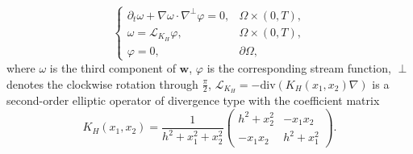 \documentclass[12pt,reqno]{amsart}
\numberwithin{equation}{section}
\theoremstyle{definition}
\theoremstyle{remark}
\begin{document}
\begin{equation}\label{vor str eq}
\begin{cases}
\partial_t \omega+\nabla \omega\cdot \nabla^\perp\varphi=0, &\Omega\times (0,T),\\
\omega=\mathcal{L}_{K_H}\varphi, &\Omega\times (0,T),\\
\varphi =0,& \partial\Omega,
\end{cases}
\end{equation}
where $ \omega  $ is the third component of $ \mathbf{w} $, $ \varphi $ is the corresponding stream function, $ \perp $ denotes the clockwise rotation through $ \frac{\pi}{2}  $, $ \mathcal{L}_{K_H} =-\text{div}(K_H(x_1,x_2)\nabla ) $ is   a second-order elliptic operator of divergence type with the coefficient matrix
\begin{equation}\label{coef matrix}
K_H(x_1,x_2)=\frac{1}{h^2+x_1^2+x_2^2}
\begin{pmatrix}
h^2+x_2^2 & -x_1x_2 \\
-x_1x_2 &  h^2+x_1^2
\end{pmatrix}.
\end{equation}
\end{document}
